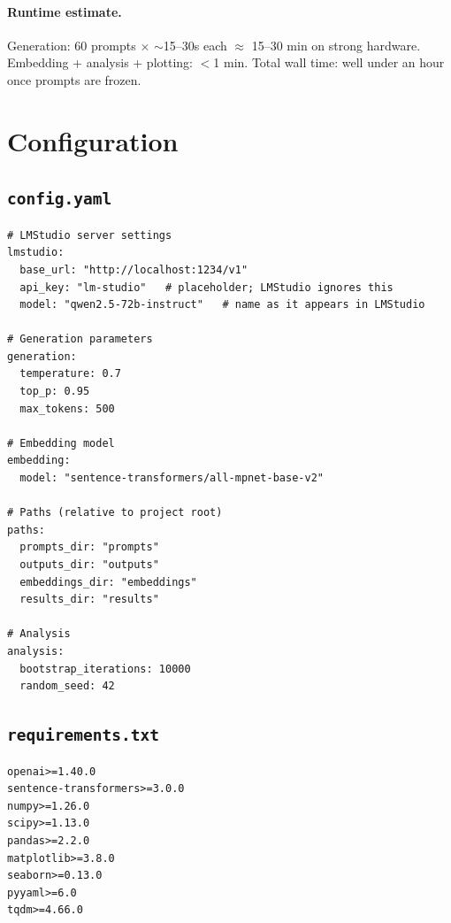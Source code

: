 \documentclass[11pt]{article}
\begin{document}
\paragraph{Runtime estimate.}
Generation: 60 prompts $\times$ $\sim$15--30s each $\approx$ 15--30 min on strong hardware. Embedding + analysis + plotting: $<$1 min. Total wall time: well under an hour once prompts are frozen.

\newpage

\section{Configuration}

\subsection{\texttt{config.yaml}}

\begin{lstlisting}[style=yamlstyle,language={}]
# LMStudio server settings
lmstudio:
  base_url: "http://localhost:1234/v1"
  api_key: "lm-studio"   # placeholder; LMStudio ignores this
  model: "qwen2.5-72b-instruct"   # name as it appears in LMStudio

# Generation parameters
generation:
  temperature: 0.7
  top_p: 0.95
  max_tokens: 500

# Embedding model
embedding:
  model: "sentence-transformers/all-mpnet-base-v2"

# Paths (relative to project root)
paths:
  prompts_dir: "prompts"
  outputs_dir: "outputs"
  embeddings_dir: "embeddings"
  results_dir: "results"

# Analysis
analysis:
  bootstrap_iterations: 10000
  random_seed: 42
\end{lstlisting}

\subsection{\texttt{requirements.txt}}

\begin{lstlisting}[style=yamlstyle,language={}]
openai>=1.40.0
sentence-transformers>=3.0.0
numpy>=1.26.0
scipy>=1.13.0
pandas>=2.2.0
matplotlib>=3.8.0
seaborn>=0.13.0
pyyaml>=6.0
tqdm>=4.66.0
\end{lstlisting}

\end{document}
